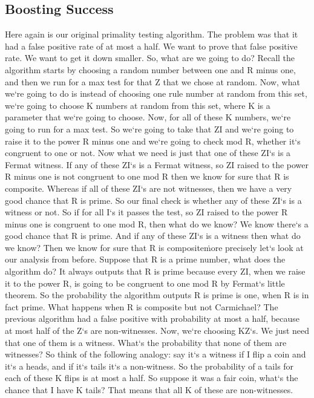 \subsection{Boosting Success}
Here again is our original primality testing algorithm.
The problem was that it had a false positive rate of at most a half.
We want to prove that false positive rate.
We want to get it down smaller.
So, what are we going to do? Recall the algorithm starts by choosing a random number between one and R minus one, and then we run for a max test for that Z that we chose at random.
Now, what we`re going to do is instead of choosing one rule number at random from this set, we`re going to choose K numbers at random from this set, where K is a parameter that we`re going to choose.
Now, for all of these K numbers, we`re going to run for a max test.
So we`re going to take that ZI and we`re going to raise it to the power R minus one and we`re going to check mod R, whether it`s congruent to one or not.
Now what we need is just that one of these ZI`s is a Fermat witness.
If any of these ZI`s is a Fermat witness, so ZI raised to the power R minus one is not congruent to one mod R then we know for sure that R is composite.
Whereas if all of these ZI`s are not witnesses, then we have a very good chance that R is prime.
So our final check is whether any of these ZI`s is a witness or not.
So if for all I`s it passes the test, so ZI raised to the power R minus one is congruent to one mod R, then what do we know? We know there`s a good chance that R is prime.
And if any of these ZI`s is a witness then what do we know? Then we know for sure that R is composite\. more precisely let`s look at our analysis from before.
Suppose that R is a prime number, what does the algorithm do? It always outputs that R is prime because every ZI, when we raise it to the power R, is going to be congruent to one mod R by Fermat`s little theorem.
So the probability the algorithm outputs R is prime is one, when R is in fact prime.
What happens when R is composite but not Carmichael? The previous algorithm had a false positive with probability at most a half, because at most half of the Z`s are non-witnesses.
Now, we`re choosing KZ`s.
We just need that one of them is a witness.
What`s the probability that none of them are witnesses? So think of the following analogy: say it`s a witness if I flip a coin and it`s a heads, and if it`s tails it`s a non-witness.
So the probability of a tails for each of these K flips is at most a half.
So suppose it was a fair coin, what`s the chance that I have K tails? That means that all K of these are non-witnesses.

